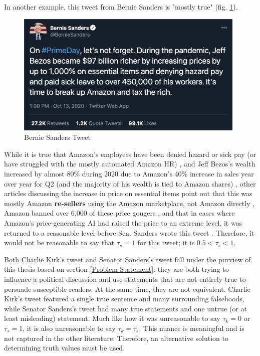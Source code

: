 \documentclass[preprint,review,12pt]{elsarticle}
\begin{document}
In another example, this tweet from Bernie Sanders is "mostly true" (fig. \ref{fig:Bernie Sanders Tweet, Oct 13, 2020}). 
 \begin{figure}[h]
    \centering
    \includegraphics[width=11cm]{BernieTweet.png}
    \caption{Bernie Sanders Tweet}
    \label{fig:Bernie Sanders Tweet, Oct 13, 2020}
\end{figure}
While it is true that Amazon's employees have been denied hazard or sick pay (or have struggled with the mostly automated Amazon HR) \cite{cnbc2020amazon,guardian2020amazon}, and Jeff Bezos's wealth increased by almost 80\% during 2020 due to Amazon's 40\% increase in sales year over year for Q2 (and the majority of his wealth is tied to Amazon shares) \cite{Stebbins2020bezos}, other articles discussing the increase in price on essential items point out that this was mostly Amazon \textbf{re-sellers} using the Amazon marketplace, not Amazon directly \cite{nicas2020sanitizer, kim2020price,gibson2020amazon}, Amazon banned over 6,000 of these price gougers \cite{bezos2020letter}, and that in cases where Amazon's price-generating AI had raised the price to an extreme level, it was returned to a reasonable level before Sen. Sanders wrote this tweet \cite{harman2020prime}. Therefore, it would not be reasonable to say that $\tau_s = 1$ for this tweet; it is $ 0.5 < \tau_s < 1$. 

Both Charlie Kirk's tweet and Senator Sanders's tweet fall under the purview of this thesis based on section \ref{Problem Statement}: they are both trying to influence a political discussion and use statements that are not entirely true to persuade susceptible readers. At the same time, they are not equivalent. Charlie Kirk's tweet featured a single true sentence and many surrounding falsehoods, while Senator Sanders's tweet had many true statements and one untrue (or at least misleading) statement. Much like how it was unreasonable to say $\tau_k = 0$ or $\tau_s = 1$, it is also unreasonable to say $\tau_k = \tau_s$. This nuance is meaningful and is not captured in the other literature. Therefore, an alternative solution to determining truth values must be used.
\end{document}
